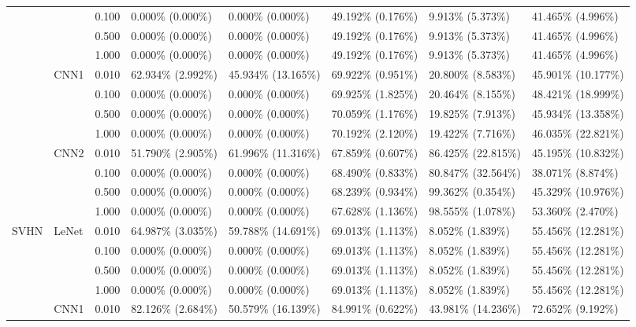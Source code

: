 \documentclass[conference,compsoc]{IEEEtran}
\begin{document}
\begin{landscape}
\begin{table}[H]
\begin{tabular}{llllllll}
& & 0.100 & 0.000\% (0.000\%) & 0.000\% (0.000\%) & 49.192\% (0.176\%) & 9.913\% (5.373\%) & 41.465\% (4.996\%) \\
& & 0.500 & 0.000\% (0.000\%) & 0.000\% (0.000\%) & 49.192\% (0.176\%) & 9.913\% (5.373\%) & 41.465\% (4.996\%) \\
& & 1.000 & 0.000\% (0.000\%) & 0.000\% (0.000\%) & 49.192\% (0.176\%) & 9.913\% (5.373\%) & 41.465\% (4.996\%) \\
\cline{2-8}
& \multirow{4}{*}{CNN1} & 0.010 & 62.934\% (2.992\%) & 45.934\% (13.165\%) & 69.922\% (0.951\%) & 20.800\% (8.583\%) & 45.901\% (10.177\%) \\
& & 0.100 & 0.000\% (0.000\%) & 0.000\% (0.000\%) & 69.925\% (1.825\%) & 20.464\% (8.155\%) & 48.421\% (18.999\%) \\
& & 0.500 & 0.000\% (0.000\%) & 0.000\% (0.000\%) & 70.059\% (1.176\%) & 19.825\% (7.913\%) & 45.934\% (13.358\%) \\
& & 1.000 & 0.000\% (0.000\%) & 0.000\% (0.000\%) & 70.192\% (2.120\%) & 19.422\% (7.716\%) & 46.035\% (22.821\%) \\
\cline{2-8}
& \multirow{4}{*}{CNN2} & 0.010 & 51.790\% (2.905\%) & 61.996\% (11.316\%) & 67.859\% (0.607\%) & 86.425\% (22.815\%) & 45.195\% (10.832\%) \\
& & 0.100 & 0.000\% (0.000\%) & 0.000\% (0.000\%) & 68.490\% (0.833\%) & 80.847\% (32.564\%) & 38.071\% (8.874\%) \\
& & 0.500 & 0.000\% (0.000\%) & 0.000\% (0.000\%) & 68.239\% (0.934\%) & 99.362\% (0.354\%) & 45.329\% (10.976\%) \\
& & 1.000 & 0.000\% (0.000\%) & 0.000\% (0.000\%) & 67.628\% (1.136\%) & 98.555\% (1.078\%) & 53.360\% (2.470\%) \\
\hline
\multirow{12}{*}{SVHN} & \multirow{4}{*}{LeNet} & 0.010 & 64.987\% (3.035\%) & 59.788\% (14.691\%) & 69.013\% (1.113\%) & 8.052\% (1.839\%) & 55.456\% (12.281\%) \\
& & 0.100 & 0.000\% (0.000\%) & 0.000\% (0.000\%) & 69.013\% (1.113\%) & 8.052\% (1.839\%) & 55.456\% (12.281\%) \\
& & 0.500 & 0.000\% (0.000\%) & 0.000\% (0.000\%) & 69.013\% (1.113\%) & 8.052\% (1.839\%) & 55.456\% (12.281\%) \\
& & 1.000 & 0.000\% (0.000\%) & 0.000\% (0.000\%) & 69.013\% (1.113\%) & 8.052\% (1.839\%) & 55.456\% (12.281\%) \\
\cline{2-8}
& \multirow{4}{*}{CNN1} & 0.010 & 82.126\% (2.684\%) & 50.579\% (16.139\%) & 84.991\% (0.622\%) & 43.981\% (14.236\%) & 72.652\% (9.192\%) \\

\end{tabular}
\end{table}
\end{landscape}
\end{document}
